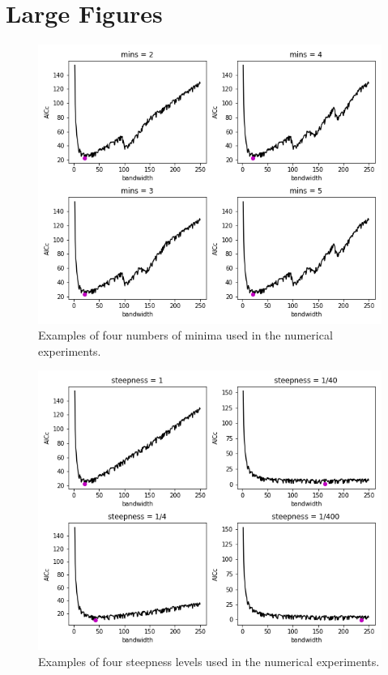 \documentclass[letterpaper,12pt,twocolumn]{article}
\begin{document}
\printbibliography
\pagebreak

\onecolumn
\section*{Large Figures}
\label{sec:figs}

\begin{figure}[h!]
    \centering
    \includegraphics[width=\textwidth]{../figures/multiple-mins-curves.png}
    \caption{Examples of four numbers of minima used in the numerical experiments.}
    \label{fig:multiple-mins}
\end{figure}

\begin{figure}
    \centering
    \includegraphics[width=\textwidth]{../figures/steep-curves.png}
    \caption{Examples of four steepness levels used in the numerical experiments.}
    \label{fig:steep-curves}
\end{figure}
\end{document}
